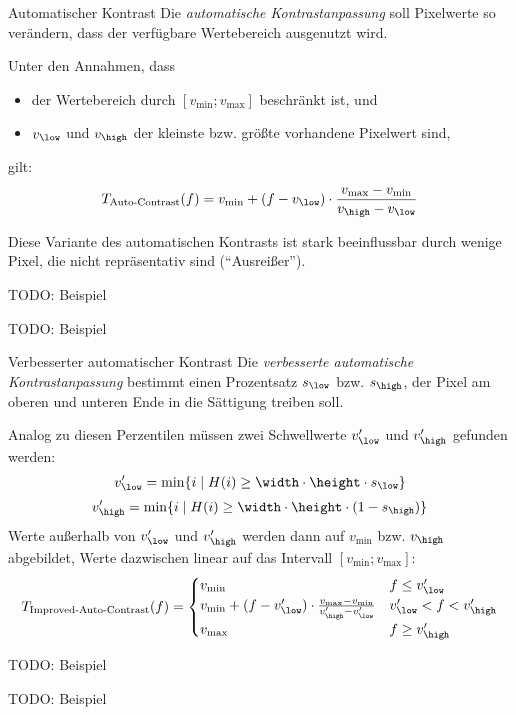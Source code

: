\begin{defi}{Automatischer Kontrast}
    Die \emph{automatische Kontrastanpassung} soll Pixelwerte so verändern, dass der verfügbare Wertebereich ausgenutzt wird.

    Unter den Annahmen, dass
    \begin{itemize}
        \item der Wertebereich durch $[v_{\min}; v_{\max}]$ beschränkt ist, und
        \item $v_{\low}$ und $v_{\high}$ der kleinste bzw. größte vorhandene Pixelwert sind,
    \end{itemize}
    gilt:
    \[
        T_{\text{Auto-Contrast}}(f) = v_{\min} + (f - v_{\low}) \cdot \frac{v_{\max} - v_{\min}}{v_{\high} - v_{\low}}
    \]

    Diese Variante des automatischen Kontrasts ist stark beeinflussbar durch wenige Pixel, die nicht repräsentativ sind (\enquote{Ausreißer}).

    TODO: Beispiel

    TODO: Beispiel
\end{defi}

\begin{defi}{Verbesserter automatischer Kontrast}
    Die \emph{verbesserte automatische Kontrastanpassung} bestimmt einen Prozentsatz $s_{\low}$ bzw. $s_{\high}$, der Pixel am oberen und unteren Ende in die Sättigung treiben soll.

    Analog zu diesen Perzentilen müssen zwei Schwellwerte $v'_{\low}$ und $v'_{\high}$ gefunden werden:
    \[
        v'_{\low} = \min \{ i \mid H(i) \geq \width \cdot \height \cdot s_{\low} \}
    \]
    \[
        v'_{\high} = \min \{ i \mid H(i) \geq \width \cdot \height \cdot (1 - s_{\high}) \}
    \]
    Werte außerhalb von $v'_{\low}$ und $v'_{\high}$ werden dann auf $v_{\min}$ bzw. $v_{\high}$ abgebildet, Werte dazwischen linear auf das Intervall $[v_{\min}; v_{\max}]$:
    \[
        T_{\text{Improved-Auto-Contrast}}(f) =
        \begin{cases}
            v_{\min}                                                                            & f \leq v'_{\low}           \\
            v_{\min} + (f - v'_{\low}) \cdot \frac{v_{\max} - v_{\min}}{v'_{\high} - v'_{\low}} & v'_{\low} < f < v'_{\high} \\
            v_{\max}                                                                            & f \geq v'_{\high}
        \end{cases}
    \]

    TODO: Beispiel

    TODO: Beispiel
\end{defi}

